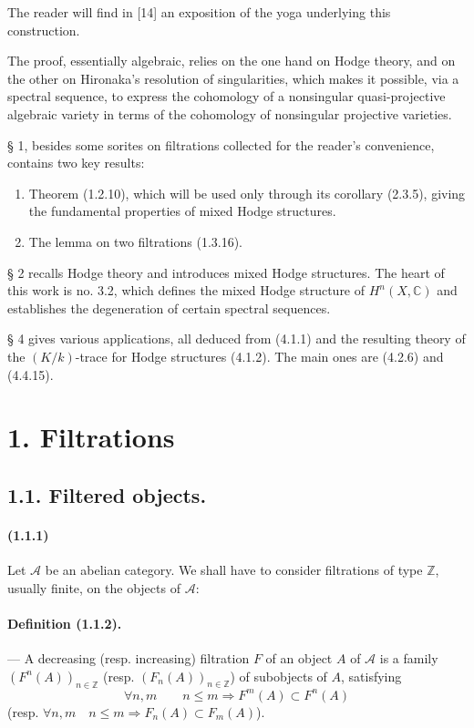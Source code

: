 \documentclass[10pt]{article}
\newcommand{\C}{\mathbb C}
\newcommand{\Z}{\mathbb Z}
\newcommand{\fg}{\guillemotright}
\newcommand{\og}{\guillemotleft}
\newcommand{\calA}{\mathcal A}
\begin{document}
The reader will find in [14] an exposition of the yoga underlying this construction.

The proof, essentially algebraic, relies on the one hand on Hodge theory, and on the other on Hironaka's resolution of singularities, which makes it possible, via a spectral sequence, \og to express\fg{} the cohomology of a nonsingular quasi-projective algebraic variety in terms of the cohomology of nonsingular projective varieties.

§ 1, besides some sorites on filtrations collected for the reader's convenience, contains two key results:
\begin{enumerate}[label=\alph*)]
\item Theorem (1.2.10), which will be used only through its corollary (2.3.5), giving the fundamental properties of \og mixed Hodge structures\fg{}.
\item The \og lemma on two filtrations\fg{} (1.3.16).
\end{enumerate}
§ 2 recalls Hodge theory and introduces mixed Hodge structures. The heart of this work is no. 3.2, which defines the mixed Hodge structure of $H^n(X,\C)$ and establishes the degeneration of certain spectral sequences.

§ 4 gives various applications, all deduced from (4.1.1) and the resulting theory of the $(K/k)$-trace for Hodge structures (4.1.2). The main ones are (4.2.6) and (4.4.15).

\section*{1. Filtrations}
\subsection*{1.1. Filtered objects.}

\paragraph{(1.1.1)} Let $\calA$ be an abelian category. We shall have to consider filtrations of type $\Z$, usually finite, on the objects of $\calA$:

\paragraph{Definition (1.1.2).} --- A decreasing (resp. increasing) filtration $F$ of an object $A$ of $\calA$ is a family $(F^n(A))_{n\in\Z}$ (resp. $(F_n(A))_{n\in\Z}$) of subobjects of $A$, satisfying
\[
\forall n,m\qquad n\le m\Rightarrow F^m(A)\subset F^n(A)
\]
(resp. $\forall n,m\quad n\le m\Rightarrow F_n(A)\subset F_m(A)$).
\end{document}
